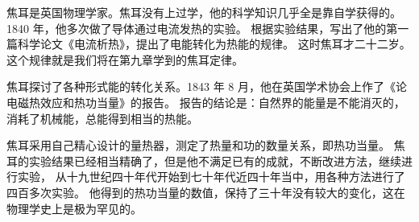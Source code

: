 焦耳是英国物理学家。焦耳没有上过学，他的科学知识几乎全是靠自学获得的。
1840 年，他多次做了导体通过电流发热的实验。
根据实验结果，写出了他的第一篇科学论文《电流析热》，提出了电能转化为热能的规律。
这时焦耳才二十二岁。这个规律就是我们将在第九章学到的焦耳定律。

焦耳探讨了各种形式能的转化关系。1843 年 8 月，他在英国学术协会上作了《论电磁热效应和热功当量》的报告。
报告的结论是：自然界的能量是不能消灭的，消耗了机械能，总能得到相当的热能。

焦耳采用自己精心设计的量热器，测定了热量和功的数量关系，即热功当量。
焦耳的实验结果已经相当精确了，但是他不满足已有的成就，不断改进方法，继续进行实验，
从十九世纪四十年代开始到七十年代近四十年当中，用各种方法进行了四百多次实验。
他得到的热功当量的数值，保持了三十年没有较大的变化，这在物理学史上是极为罕见的。


